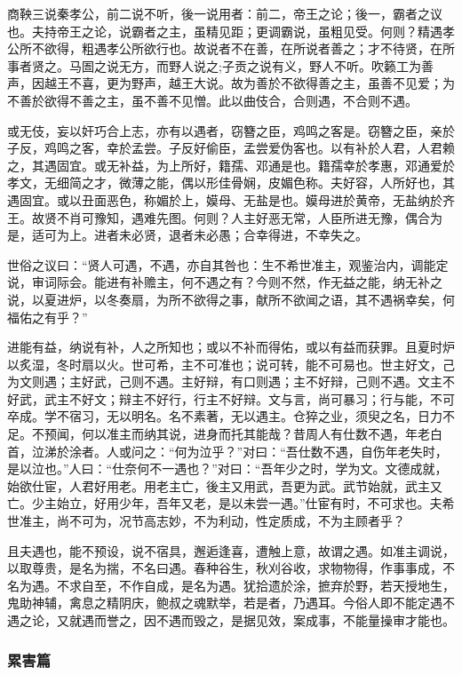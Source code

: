 \documentclass[]{article}
\begin{document}
商鞅三说秦孝公，前二说不听，後一说用者：前二，帝王之论；後一，霸者之议也。夫持帝王之论，说霸者之主，虽精见距；更调霸说，虽粗见受。何则？精遇孝公所不欲得，粗遇孝公所欲行也。故说者不在善，在所说者善之；才不待贤，在所事者贤之。马圄之说无方，而野人说之;子贡之说有义，野人不听。吹籁工为善声，因越王不喜，更为野声，越王大说。故为善於不欲得善之主，虽善不见爱；为不善於欲得不善之主，虽不善不见憎。此以曲伎合，合则遇，不合则不遇。

或无伎，妄以奸巧合上志，亦有以遇者，窃簪之臣，鸡鸣之客是。窃簪之臣，亲於子反，鸡鸣之客，幸於孟尝。子反好偷臣，孟尝爱伪客也。以有补於人君，人君赖之，其遇固宜。或无补益，为上所好，籍孺、邓通是也。籍孺幸於孝惠，邓通爱於孝文，无细简之才，微薄之能，偶以形佳骨娴，皮媚色称。夫好容，人所好也，其遇固宜。或以丑面恶色，称媚於上，嫫母、无盐是也。嫫母进於黄帝，无盐纳於齐王。故贤不肖可豫知，遇难先图。何则？人主好恶无常，人臣所进无豫，偶合为是，适可为上。进者未必贤，退者未必愚；合幸得进，不幸失之。

世俗之议曰：``贤人可遇，不遇，亦自其咎也：生不希世准主，观鉴治内，调能定说，审词际会。能进有补赡主，何不遇之有？今则不然，作无益之能，纳无补之说，以夏进炉，以冬奏扇，为所不欲得之事，献所不欲闻之语，其不遇祸幸矣，何福佑之有乎？''

进能有益，纳说有补，人之所知也；或以不补而得佑，或以有益而获罪。且夏时炉以炙湿，冬时扇以火。世可希，主不可准也；说可转，能不可易也。世主好文，己为文则遇；主好武，己则不遇。主好辩，有口则遇；主不好辩，己则不遇。文主不好武，武主不好文；辩主不好行，行主不好辩。文与言，尚可暴习；行与能，不可卒成。学不宿习，无以明名。名不素著，无以遇主。仓猝之业，须臾之名，日力不足。不预闻，何以准主而纳其说，进身而托其能哉？昔周人有仕数不遇，年老白首，泣涕於涂者。人或问之：``何为泣乎？''对曰：``吾仕数不遇，自伤年老失时，是以泣也。''人曰：``仕奈何不一遇也？''对曰：``吾年少之时，学为文。文德成就，始欲仕宦，人君好用老。用老主亡，後主又用武，吾更为武。武节始就，武主又亡。少主始立，好用少年，吾年又老，是以未尝一遇。''仕宦有时，不可求也。夫希世准主，尚不可为，况节高志妙，不为利动，性定质成，不为主顾者乎？

且夫遇也，能不预设，说不宿具，邂逅逢喜，遭触上意，故谓之遇。如准主调说，以取尊贵，是名为揣，不名曰遇。春种谷生，秋刈谷收，求物物得，作事事成，不名为遇。不求自至，不作自成，是名为遇。犹拾遗於涂，摭弃於野，若天授地生，鬼助神辅，禽息之精阴庆，鲍叔之魂默举，若是者，乃遇耳。今俗人即不能定遇不遇之论，又就遇而誉之，因不遇而毁之，是据见效，案成事，不能量操审才能也。

\hypertarget{header-n19}{%
\subsubsection{累害篇}\label{header-n19}}
\end{document}

